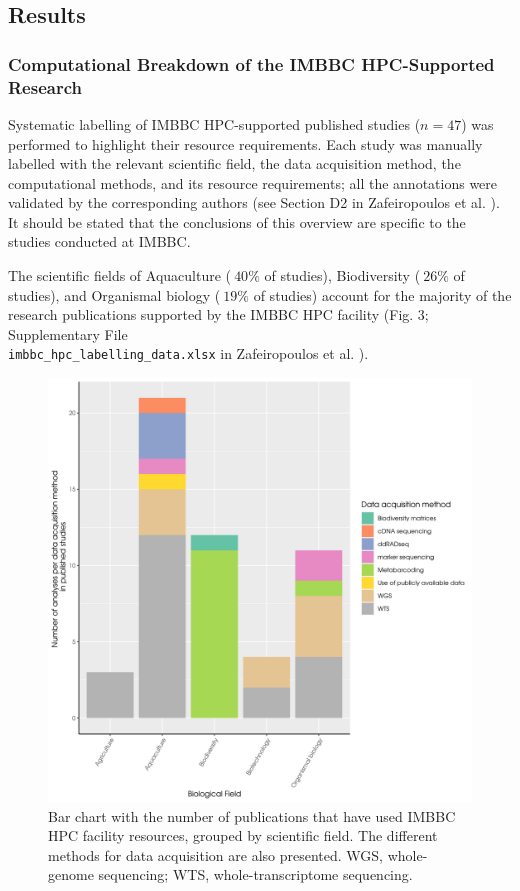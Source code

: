    \subsection{Results}

   \subsubsection*{Computational Breakdown of the IMBBC HPC-Supported Research}

   Systematic labelling of IMBBC HPC-supported published studies ($n = 47$) was performed to highlight their resource requirements. 
   Each study was manually labelled with the relevant scientific field, the data acquisition method, the computational methods, and its resource requirements; 
   all the annotations were validated by the corresponding authors (see Section D2 in Zafeiropoulos et al. \citep{haris_zafeiropoulos_2021_4665308}). 
   It should be stated that the conclusions of this overview are specific to the studies conducted at IMBBC.

   The scientific fields of Aquaculture ($~40\%$ of studies), Biodiversity ($~26\%$ of studies), and Organismal biology ($~19\%$ of studies) account for the majority of the research publications supported by the IMBBC HPC facility (Fig. 3; Supplementary File \\
   \texttt{imbbc\_hpc\_labelling\_data.xlsx} in Zafeiropoulos et al. \citep{haris_zafeiropoulos_2021_4665308}).
   

   \begin{figure}
      \centering
      \label{fig:studies}
      \includegraphics[width=\columnwidth]{figures/number_of_studies_biological_field_data_acquisition_method_plot.png}
      \caption{
         Bar chart with the number of publications that have used IMBBC HPC facility resources, grouped by scientific field. The different methods for data acquisition are also presented. WGS, whole-genome sequencing; WTS, whole-transcriptome sequencing.
      }
   \end{figure}


